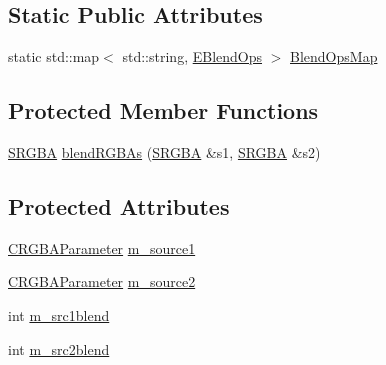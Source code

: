 \subsection*{Static Public Attributes}
\begin{DoxyCompactItemize}
\item 
static std::map$<$ std::string, \hyperlink{namespaceanl_a7defa07650ae1bf85b1031eb93e04734}{EBlendOps} $>$ \hyperlink{classanl_1_1CRGBABlendOps_a51810f1e128b03e029efd580e7534b7f}{BlendOpsMap}
\end{DoxyCompactItemize}
\subsection*{Protected Member Functions}
\begin{DoxyCompactItemize}
\item 
\hyperlink{structanl_1_1SRGBA}{SRGBA} \hyperlink{classanl_1_1CRGBABlendOps_a7af83e2e3aac64344568cc97d1d405e1}{blendRGBAs} (\hyperlink{structanl_1_1SRGBA}{SRGBA} \&s1, \hyperlink{structanl_1_1SRGBA}{SRGBA} \&s2)
\end{DoxyCompactItemize}
\subsection*{Protected Attributes}
\begin{DoxyCompactItemize}
\item 
\hyperlink{classanl_1_1CRGBAParameter}{CRGBAParameter} \hyperlink{classanl_1_1CRGBABlendOps_a7bdee6c42d96fa6fc8676bfeb1c75ed2}{m\_\-source1}
\item 
\hyperlink{classanl_1_1CRGBAParameter}{CRGBAParameter} \hyperlink{classanl_1_1CRGBABlendOps_aff511d48f148090321bc76d3e7932d2a}{m\_\-source2}
\item 
int \hyperlink{classanl_1_1CRGBABlendOps_a55568c4207291a6f422c014489480dbe}{m\_\-src1blend}
\item 
int \hyperlink{classanl_1_1CRGBABlendOps_a1eeaa9a775e2821f461a8cde474df19d}{m\_\-src2blend}
\end{DoxyCompactItemize}


